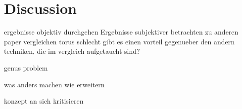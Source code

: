 \chapter{Discussion}
\label{sec:dicussion}

ergebnisse objektiv durchgehen
Ergebnisse subjektiver betrachten
zu anderen paper vergleichen
torus schlecht
gibt es einen vorteil gegenueber den andern techniken, die im vergleich aufgetaucht sind?

genus problem

was anders machen
wie erweitern

konzept an sich kritisieren
